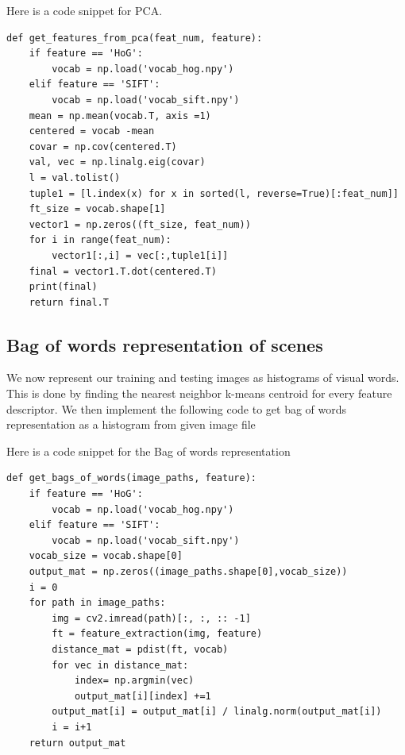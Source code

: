Here is a code snippet for PCA.




\begin{lstlisting}[style=Matlab-editor]
def get_features_from_pca(feat_num, feature):
    if feature == 'HoG':
        vocab = np.load('vocab_hog.npy')
    elif feature == 'SIFT':
        vocab = np.load('vocab_sift.npy')
    mean = np.mean(vocab.T, axis =1)
    centered = vocab -mean
    covar = np.cov(centered.T)
    val, vec = np.linalg.eig(covar)
    l = val.tolist()
    tuple1 = [l.index(x) for x in sorted(l, reverse=True)[:feat_num]]
    ft_size = vocab.shape[1]
    vector1 = np.zeros((ft_size, feat_num))
    for i in range(feat_num):
        vector1[:,i] = vec[:,tuple1[i]]
    final = vector1.T.dot(centered.T)
    print(final)
    return final.T
\end{lstlisting}
\vspace{-10pt}

\subsection*{Bag of words representation of scenes}
\vspace{-5pt}
We now represent our training and testing images as histograms of visual words. This is done by finding the nearest neighbor k-means centroid for every feature descriptor. We then implement the following code to get bag of words representation as a histogram from given image file

Here is a code snippet for the Bag of words representation
\begin{lstlisting}[style=Matlab-editor]
def get_bags_of_words(image_paths, feature):
    if feature == 'HoG':
        vocab = np.load('vocab_hog.npy')
    elif feature == 'SIFT':
        vocab = np.load('vocab_sift.npy')
    vocab_size = vocab.shape[0]
    output_mat = np.zeros((image_paths.shape[0],vocab_size))
    i = 0
    for path in image_paths:
        img = cv2.imread(path)[:, :, :: -1]
        ft = feature_extraction(img, feature)
        distance_mat = pdist(ft, vocab)
        for vec in distance_mat:
            index= np.argmin(vec)
            output_mat[i][index] +=1
        output_mat[i] = output_mat[i] / linalg.norm(output_mat[i])
        i = i+1
    return output_mat
\end{lstlisting}
\vspace{-10pt}

